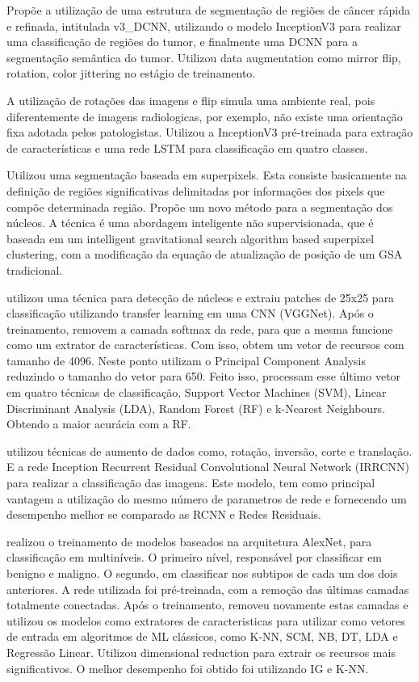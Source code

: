\documentclass[preprint,12pt,authoryear]{elsarticle}
\begin{document}
\cite{GUO2019} Propõe a utilização de uma estrutura de segmentação de regiões de câncer rápida e refinada, intitulada v3\_DCNN, utilizando o modelo Inception\-V3 para realizar uma classificação de regiões do tumor, e finalmente uma DCNN para a segmentação semântica do tumor. Utilizou data augmentation como mirror flip, rotation, color jittering no estágio de treinamento.

\cite{YAN2019}  A utilização de rotações das imagens e flip simula uma ambiente real, pois diferentemente de imagens radiologicas, por exemplo, não existe uma orientação fixa adotada pelos patologistas.
Utilizou a Inception\-V3 pré-treinada para extração de características e uma rede LSTM para classificação em quatro classes.

\cite{MITTAL2019} Utilizou uma segmentação baseada em superpixels. Esta consiste basicamente na definição de regiões significativas delimitadas por informações dos pixels que compõe determinada região. Propõe um novo método para a segmentação dos núcleos. A técnica é uma abordagem inteligente não supervisionada, que é baseada em um intelligent gravitational search algorithm based superpixel clustering, com a modificação da equação de atualização de posição de um GSA tradicional.

\cite{SABEENABEEVI2019} utilizou uma técnica para detecção de núcleos e extraiu patches de 25x25 para classificação utilizando transfer learning em uma CNN (VGGNet). Após o treinamento, removem a camada softmax da rede, para que a mesma funcione como um extrator de características. Com isso, obtem um vetor de recursos com tamanho de 4096. Neste ponto utilizam o Principal Component Analysis reduzindo o tamanho do vetor para 650. Feito isso, processam esse último vetor em quatro técnicas de classificação, Support Vector Machines (SVM), Linear Discriminant Analysis (LDA), Random Forest (RF) e k-Nearest Neighbours. Obtendo a maior acurácia com a RF.

\cite{ALOM2019} utilizou técnicas de aumento de dados como, rotação, inversão, corte e translação. E a rede Inception Recurrent Residual Convolutional Neural Network (IRRCNN) para realizar a classificação das imagens. Este modelo, tem como principal vantagem a utilização do mesmo número de parametros de rede e fornecendo um desempenho melhor se comparado as RCNN e Redes Residuais.

\cite{MURTAZA2019} realizou o treinamento de modelos baseados na arquitetura AlexNet, para classificação em multiníveis. O primeiro nível, responsável por classificar em benigno e maligno. O segundo, em classificar nos subtipos de cada um dos dois anteriores. A rede utilizada foi pré-treinada, com a remoção das últimas camadas totalmente conectadas. Após o treinamento, removeu novamente estas camadas e utilizou os modelos como extratores de caracteristicas para utilizar como vetores de entrada em algoritmos de ML clássicos, como K-NN, SCM, NB, DT, LDA e Regressão Linear. Utilizou dimensional reduction para extrair os recursos mais significativos. O melhor desempenho foi obtido foi utilizando IG e K-NN.
\end{document}
